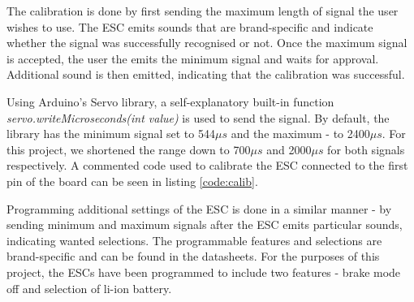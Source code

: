 The calibration is done by first sending the maximum length of signal the user wishes to use. The ESC emits sounds that are brand-specific and indicate whether the signal was successfully recognised or not. Once the maximum signal is accepted, the user the emits the minimum signal and waits for approval. Additional sound is then emitted, indicating that the calibration was successful.

Using Arduino's Servo library, a self-explanatory built-in function \textit{servo.writeMicroseconds(int value)} is used to send the signal. By default, the library has the minimum signal set to 544$\mu s$ and the maximum - to 2400$\mu s$. For this project, we shortened the range down to 700$\mu s$ and 2000$\mu s$ for both signals respectively. A commented code used to calibrate the ESC connected to the first pin of the board can be seen in listing \ref{code:calib}.



Programming additional settings of the ESC is done in a similar manner - by sending minimum and maximum signals after the ESC emits particular sounds, indicating wanted selections. The programmable features and selections are brand-specific and can be found in the datasheets. For the purposes of this project, the ESCs have been programmed to include two features - brake mode off and selection of li-ion battery.


